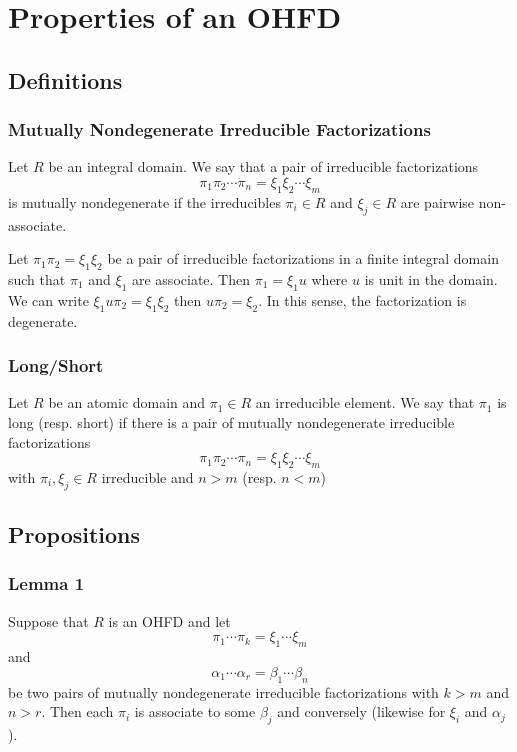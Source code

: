 \section{Properties of an OHFD}

\subsection{Definitions}

\begin{frame}
  \frametitle{Mutually Nondegenerate Irreducible Factorizations}
  \begin{definition}
    Let $R$ be an integral domain. We say that a pair of irreducible factorizations
      $$\pi_1\pi_2\cdots\pi_n = \xi_1\xi_2\cdots\xi_m$$
    is \alert{mutually nondegenerate} if the irreducibles $\pi_i \in R$ and $\xi_j \in R$ are pairwise non-associate.
  \end{definition}
  \begin{example}
    Let $\pi_1 \pi_2 = \xi_1 \xi_2$ be a pair of irreducible factorizations in a finite integral domain such that $\pi_1$ and $\xi_1$ are associate.
    Then $\pi_1 = \xi_1 u$ where $u$ is unit in the domain.
    We can write $\xi_1 u \pi_2 = \xi_1 \xi_2$ then $u \pi_2 = \xi_2$.
    In this sense, the factorization is degenerate.
  \end{example}
\end{frame}

\begin{frame}
  \frametitle{Long/Short}
  \begin{definition}
    Let $R$ be an atomic domain and $\pi_1 \in R$ an irreducible element.
    We say that $\pi_1$ is \alert{long} (resp. \alert{short}) if there is a pair of mutually nondegenerate irreducible factorizations
      $$\pi_1\pi_2\cdots\pi_n = \xi_1\xi_2\cdots \xi_m$$
    with $\pi_i, \xi_j \in R$ irreducible and $n > m$ (resp. $n<m$)
  \end{definition}
\end{frame}

\subsection{Propositions}

\begin{frame}
  \frametitle{Lemma 1}
  \begin{lemma}
    Suppose that $R$ is an OHFD and let
      $$\pi_1\cdots\pi_k=\xi_1\cdots\xi_m$$
      and
      $$\alpha_1\cdots\alpha_r=\beta_1\cdots\beta_n$$
    be two pairs of mutually nondegenerate irreducible factorizations with $k>m$ and $n>r$.
    Then each $\pi_i$ is associate to some $\beta_j$ and conversely (likewise for $\xi_i$ and $\alpha_j$). 
  \end{lemma}
\end{frame}

